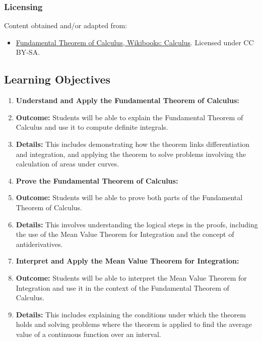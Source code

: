 \subsubsection{Licensing}
\label{sss:lice-7352}

Content obtained and/or adapted from:

\begin{itemize}

\item \href{https://en.wikibooks.org/wiki/Calculus/Fundamental_Theorem_of_Calculus}{Fundamental Theorem of Calculus, Wikibooks: Calculus}.  
Licensed under CC BY-SA.

\end{itemize}


\subsection{Learning Objectives}

\begin{enumerate}
    \item \textbf{Understand and Apply the Fundamental Theorem of Calculus:}
    \item \textbf{Outcome:} Students will be able to explain the Fundamental Theorem of Calculus and use it to compute definite integrals.
    \item \textbf{Details:} This includes demonstrating how the theorem links differentiation and integration, and applying the theorem to solve problems involving the calculation of areas under curves.
    \item \textbf{Prove the Fundamental Theorem of Calculus:}
    \item \textbf{Outcome:} Students will be able to prove both parts of the Fundamental Theorem of Calculus.
    \item \textbf{Details:} This involves understanding the logical steps in the proofs, including the use of the Mean Value Theorem for Integration and the concept of antiderivatives.
    \item \textbf{Interpret and Apply the Mean Value Theorem for Integration:}
    \item \textbf{Outcome:} Students will be able to interpret the Mean Value Theorem for Integration and use it in the context of the Fundamental Theorem of Calculus.
    \item \textbf{Details:} This includes explaining the conditions under which the theorem holds and solving problems where the theorem is applied to find the average value of a continuous function over an interval.
\end{enumerate}

